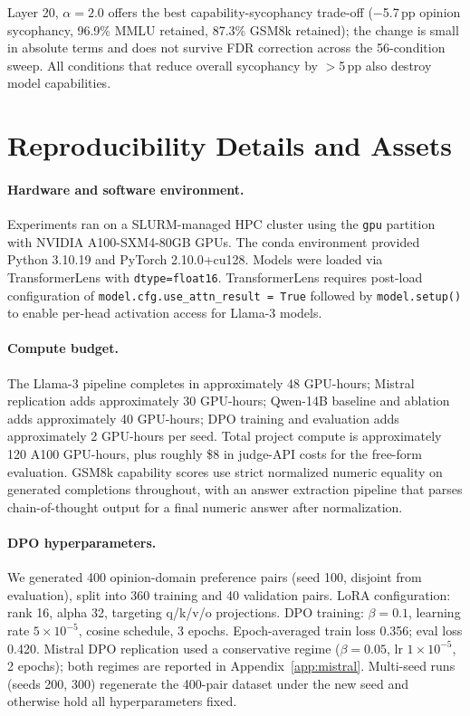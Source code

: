 \documentclass{article}
\begin{document}
Layer 20, $\alpha=2.0$ offers the best capability-sycophancy trade-off ($-$5.7\,pp opinion sycophancy, 96.9\% MMLU retained, 87.3\% GSM8k retained); the change is small in absolute terms and does not survive FDR correction across the 56-condition sweep. All conditions that reduce overall sycophancy by $>$5\,pp also destroy model capabilities.

\FloatBarrier
\section{Reproducibility Details and Assets}
\label{app:reproducibility}

\paragraph{Hardware and software environment.} Experiments ran on a SLURM-managed HPC cluster using the \texttt{gpu} partition with NVIDIA A100-SXM4-80GB GPUs. The conda environment provided Python 3.10.19 and PyTorch 2.10.0+cu128. Models were loaded via TransformerLens with \texttt{dtype=float16}. TransformerLens requires post-load configuration of \texttt{model.cfg.use\_attn\_result = True} followed by \texttt{model.setup()} to enable per-head activation access for Llama-3 models.

\paragraph{Compute budget.} The Llama-3 pipeline completes in approximately 48 GPU-hours; Mistral replication adds approximately 30 GPU-hours; Qwen-14B baseline and ablation adds approximately 40 GPU-hours; DPO training and evaluation adds approximately 2 GPU-hours per seed. Total project compute is approximately 120 A100 GPU-hours, plus roughly \$8 in judge-API costs for the free-form evaluation. GSM8k capability scores use strict normalized numeric equality on generated completions throughout, with an answer extraction pipeline that parses chain-of-thought output for a final numeric answer after normalization.

\paragraph{DPO hyperparameters.} We generated 400 opinion-domain preference pairs (seed 100, disjoint from evaluation), split into 360 training and 40 validation pairs. LoRA configuration: rank 16, alpha 32, targeting q/k/v/o projections. DPO training: $\beta=0.1$, learning rate $5\times10^{-5}$, cosine schedule, 3 epochs. Epoch-averaged train loss 0.356; eval loss 0.420. Mistral DPO replication used a conservative regime ($\beta{=}0.05$, lr $1\times10^{-5}$, 2 epochs); both regimes are reported in Appendix~\ref{app:mistral}. Multi-seed runs (seeds 200, 300) regenerate the 400-pair dataset under the new seed and otherwise hold all hyperparameters fixed.
\end{document}
